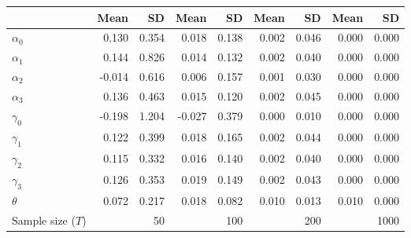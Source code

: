 
\begin{tabular}[t]{lrrrrrrrr}
\toprule
  & Mean & SD & Mean  & SD  & Mean   & SD   & Mean    & SD   \\
\midrule
$\alpha_{0}$ & 0.130 & 0.354 & 0.018 & 0.138 & 0.002 & 0.046 & 0.000 & 0.000\\
$\alpha_{1}$ & 0.144 & 0.826 & 0.014 & 0.132 & 0.002 & 0.040 & 0.000 & 0.000\\
$\alpha_{2}$ & -0.014 & 0.616 & 0.006 & 0.157 & 0.001 & 0.030 & 0.000 & 0.000\\
$\alpha_{3}$ & 0.136 & 0.463 & 0.015 & 0.120 & 0.002 & 0.045 & 0.000 & 0.000\\
$\gamma_{0}$ & -0.198 & 1.204 & -0.027 & 0.379 & 0.000 & 0.010 & 0.000 & 0.000\\
$\gamma_{1}$ & 0.122 & 0.399 & 0.018 & 0.165 & 0.002 & 0.044 & 0.000 & 0.000\\
$\gamma_{2}$ & 0.115 & 0.332 & 0.016 & 0.140 & 0.002 & 0.040 & 0.000 & 0.000\\
$\gamma_{3}$ & 0.126 & 0.353 & 0.019 & 0.149 & 0.002 & 0.043 & 0.000 & 0.000\\
$\theta$ & 0.072 & 0.217 & 0.018 & 0.082 & 0.010 & 0.013 & 0.010 & 0.000\\
Sample size ($T$) &  & 50 &  & 100 &  & 200 &  & 1000\\
\bottomrule
\end{tabular}
